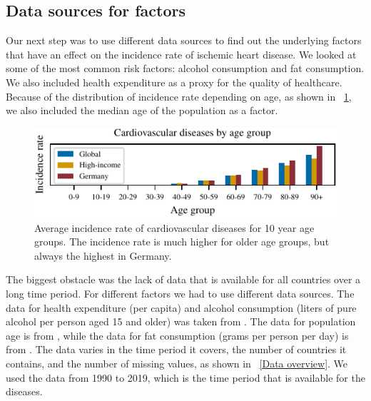 \subsection{Data sources for factors}\label{sec:data_sources}

Our next step was to use different data sources to find out the underlying factors that have an effect on the incidence rate of ischemic heart disease. We looked at some of the most common risk factors: alcohol consumption and fat consumption. We also included health expenditure as a proxy for the quality of healthcare. Because of the 
distribution of incidence rate depending on age, as shown in \figurename~\ref{Cardiovascular diseases for age groups}, we also included the median age of the population as a factor.

\begin{figure}[ht]
    \vskip 0.2in
    \begin{center}
    \centerline{\includegraphics[width=\columnwidth]{fig/fig_cardiovascular_disease_agerange.pdf}}
    \caption{Average incidence rate of cardiovascular diseases for 10 year age groups. The incidence rate is much higher for older age groups, but 
    always the highest in Germany.}
    \label{Cardiovascular diseases for age groups}
    \end{center}
    \vskip -0.2in
\end{figure}

The biggest obstacle was the lack of data that is available for all countries over a long time period. For different factors we had to use different data sources.
The data for health expenditure (per capita) and alcohol consumption (liters of pure alcohol per person aged 15 and older) was taken from \citet{oecd}. 
The data for population age is from \citet{age}, while the data for fat consumption (grams per person per day) is from \citet{fat_consumption}. The data varies in the time period it covers,
the number of countries it contains, and the number of missing values, as shown in \tablename~\ref{Data overview}. We used the data from 1990 to 2019, which is the time period
that is available for the diseases.


